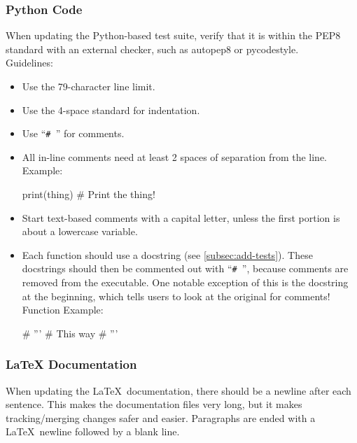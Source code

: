 \documentclass[12pt]{report}
\begin{document}
\subsubsection{Python Code}

When updating the Python-based test suite, verify that it is within the PEP8
standard with an external checker, such as autopep8 or pycodestyle. \\

Guidelines:
\begin{itemize}
\item Use the 79-character line limit.
\item Use the 4-space standard for indentation.
\item Use ``\texttt{\# }'' for comments.
\item All in-line comments need at least 2 spaces of separation from the
      line. \\
      Example:
	  \begin{pycode}
print(thing)  # Print the thing!
	  \end{pycode}

\item Start text-based comments with a capital letter, unless the first portion
      is about a lowercase variable.

\item Each function should use a docstring (see \ref{subsec:add-tests}).
      These docstrings should then be commented out with ``\texttt{\# }'',
      because comments are removed from the executable.
      One notable exception of this is the docstring at the beginning, which
      tells users to look at the original for comments! \\
      Function Example:
	  \begin{pycode}
    # '''
    # This way
    # '''
	  \end{pycode}

\end{itemize}

\subsubsection{LaTeX Documentation}

When updating the \LaTeX\ documentation, there should be a newline after each
sentence.
This makes the documentation files very long, but it makes tracking/merging
changes safer and easier.
Paragraphs are ended with a \LaTeX\ newline followed by a blank line. \\
\end{document}
